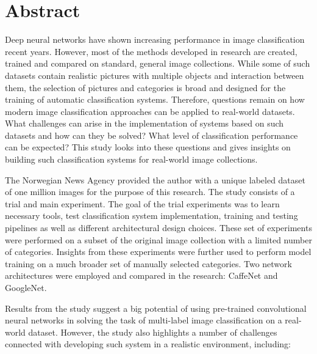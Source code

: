\chapter*{Abstract}
Deep neural networks have shown increasing performance in image classification recent years. However, most of the methods developed in research are created, trained and compared on standard, general image collections. While some of such datasets contain realistic pictures with multiple objects and interaction between them, the selection of pictures and categories is broad and designed for the training of automatic classification systems. Therefore, questions remain on how modern image classification approaches can be applied to real-world datasets. What challenges can arise in the implementation of systems based on such datasets and how can they be solved? What level of classification performance can be expected? This study looks into these questions and gives insights on building such classification systems for real-world image collections.

The Norwegian News Agency provided the author with a unique labeled dataset of one million images for the purpose of this research. The study consists of a trial and main experiment. The goal of the trial experiments was to learn necessary tools, test classification system implementation, training and testing pipelines as well as different architectural design choices. These set of experiments were performed on a subset of the original image collection with a limited number of categories. Insights from these experiments were further used to perform model training on a much broader set of manually selected categories. Two network architectures were employed and compared in the research: CaffeNet and GoogleNet. %

Results from the study suggest a big potential of using pre-trained convolutional neural networks in solving the task of multi-label image classification on a real-world dataset. However, the study also highlights a number of challenges connected with developing such system in a realistic environment, including:

